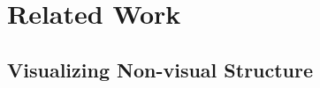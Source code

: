 \documentclass[12pt]{cmuthesis}
\begin{document}








\section{Related Work}

\subsection{Visualizing Non-visual Structure}
\end{document}
